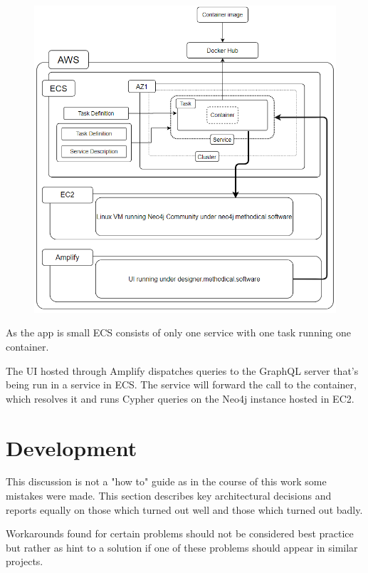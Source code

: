 \begin{figure}[h]
\centering
\includegraphics[scale=.8]{Bilder/AwsMyApp.png}
\label{ex:AwsMyApp}
\end{figure}

As the app is small ECS consists of only one service with one task running one container.

The UI hosted through Amplify dispatches queries to the GraphQL server that's being run in a service in ECS. The service will forward the call to the container, which resolves it and runs Cypher queries on the Neo4j instance hosted in EC2.

\chapter{Development}
This discussion is not a "how to" guide as in the course of this work some mistakes were made. This section describes key architectural decisions and reports equally on those which turned out well and those which turned out badly.

Workarounds found for certain problems should not be considered best practice but rather as hint to a solution if one of these problems should appear in similar projects.

